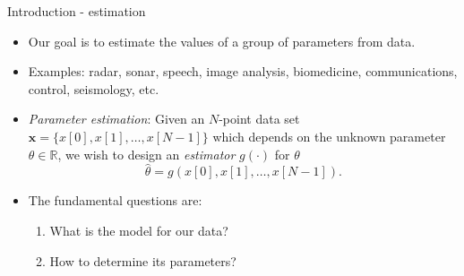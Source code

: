 \documentclass[10pt, aspectratio=169]{beamer} %
\newcommand{\R}{{\mathbb{R}}}
\begin{document}
\begin{frame}[allowframebreaks=0.8]
{Introduction - estimation}

\begin{itemize}
  \item Our goal is to estimate the values of a group of parameters from data.
  \item Examples: radar, sonar, speech, image analysis, biomedicine,
  communications, control, seismology, etc.

  \item {\em Parameter estimation}: Given an $N$-point data set
  $\mathbf{x}=\{x[0], x[1], \dots,x[N-1]\}$ which  depends on the unknown
  parameter $\theta\in \R$, we wish to design an {\em estimator} $g(\cdot)$ for $\theta$
$$\hat{\theta} = g(x[0], x[1], \dots, x[N-1]).$$  
\item The fundamental questions are:
\begin{enumerate}
	\item What is the model for our data?
	\item How to determine  its parameters?
\end{enumerate}
\end{itemize}
\end{frame}
\end{document}
